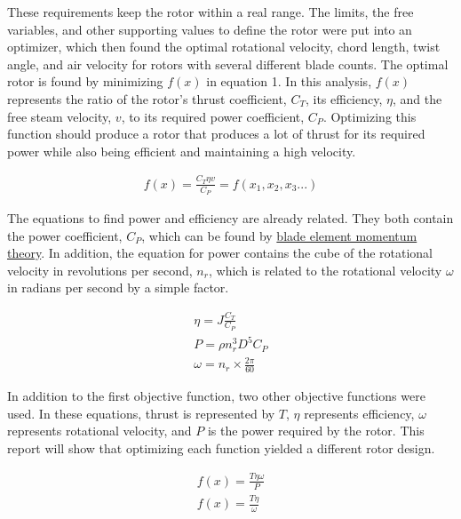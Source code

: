 \documentclass{article}
\begin{document}
These requirements keep the rotor within a real range. The limits, the free variables, and other supporting values to define the rotor were put into an optimizer, which then found the optimal rotational velocity, chord length, twist angle, and air velocity for rotors with several different blade counts. The optimal rotor is found by minimizing $f(x)$ in equation 1. In this analysis, $f(x)$ represents the ratio of the rotor's thrust coefficient, $C_{T}$, its efficiency, $\eta$, and the free steam velocity, $v$, to its required power coefficient, $C_{P}$. Optimizing this function should produce a rotor that produces a lot of thrust for its required power while also being efficient and maintaining a high velocity. \newline

\begin{equation}
\begin{aligned}
	f(x) = \frac{C_{T} \eta v}{C_{P}} = f(x_{1}, x_{2}, x_{3}...)
\end{aligned}
\end{equation}

The equations to find power and efficiency are already related. They both contain the power coefficient, $C_{P}$, which can be found by \hyperlink{BEM}{blade element momentum theory}. In addition, the equation for power contains the cube of the rotational velocity in revolutions per second, $n_{r}$, which is related to the rotational velocity $\omega$ in radians per second by a simple factor. \newline

\begin{equation}
\begin{aligned}
	\eta = J \frac{C_{T}}{C_{P}} \\
	P = \rho n_{r}^{3} D^{5} C_{P} \\
	\omega = n_{r} \times \frac{2 \pi}{60}
\end{aligned}
\end{equation}

In addition to the first objective function, two other objective functions were used. In these equations, thrust is represented by $T$, $\eta$ represents efficiency, $\omega$ represents rotational velocity, and $P$ is the power required by the rotor. This report will show that optimizing each function yielded a different rotor design. 

\begin{equation}
\begin{aligned}
	f(x) = \frac{T \eta \omega}{P}  \\
	f(x) = \frac{T \eta}{\omega}
\end{aligned}
\end{equation}
\end{document}
